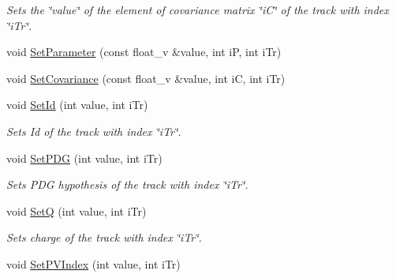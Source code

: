 \begin{DoxyCompactItemize}
\begin{DoxyCompactList}\small\item\em Sets the \char`\"{}value\char`\"{} of the element of covariance matrix \char`\"{}i\+C\char`\"{} of the track with index \char`\"{}i\+Tr\char`\"{}. \end{DoxyCompactList}\item 
void \hyperlink{classKFPTrackVector_a1af5b91956e12e205f79977fc351b009}{Set\+Parameter} (const float\+\_\+v \&value, int iP, int i\+Tr)
\item 
void \hyperlink{classKFPTrackVector_aebb11e45669e3a924867561f37999aba}{Set\+Covariance} (const float\+\_\+v \&value, int iC, int i\+Tr)
\item 
void \hyperlink{classKFPTrackVector_a5d33e541579a7c014642ad58ee63c028}{Set\+Id} (int value, int i\+Tr)\hypertarget{classKFPTrackVector_a5d33e541579a7c014642ad58ee63c028}{}\label{classKFPTrackVector_a5d33e541579a7c014642ad58ee63c028}

\begin{DoxyCompactList}\small\item\em Sets Id of the track with index \char`\"{}i\+Tr\char`\"{}. \end{DoxyCompactList}\item 
void \hyperlink{classKFPTrackVector_a70b88349ccc747d771d31ade6661be64}{Set\+P\+DG} (int value, int i\+Tr)\hypertarget{classKFPTrackVector_a70b88349ccc747d771d31ade6661be64}{}\label{classKFPTrackVector_a70b88349ccc747d771d31ade6661be64}

\begin{DoxyCompactList}\small\item\em Sets P\+DG hypothesis of the track with index \char`\"{}i\+Tr\char`\"{}. \end{DoxyCompactList}\item 
void \hyperlink{classKFPTrackVector_a5b26fb87763991b1ae76fc5a75c90d7e}{SetQ} (int value, int i\+Tr)\hypertarget{classKFPTrackVector_a5b26fb87763991b1ae76fc5a75c90d7e}{}\label{classKFPTrackVector_a5b26fb87763991b1ae76fc5a75c90d7e}

\begin{DoxyCompactList}\small\item\em Sets charge of the track with index \char`\"{}i\+Tr\char`\"{}. \end{DoxyCompactList}\item 
void \hyperlink{classKFPTrackVector_acee5dffca065cbe3eda6fd2a2b1b97bf}{Set\+P\+V\+Index} (int value, int i\+Tr)\hypertarget{classKFPTrackVector_acee5dffca065cbe3eda6fd2a2b1b97bf}{}\label{classKFPTrackVector_acee5dffca065cbe3eda6fd2a2b1b97bf}


\end{DoxyCompactItemize}
